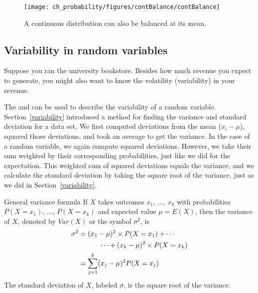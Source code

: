 \begin{figure}
\centering
\texttt{[image: ch\_probability/figures/contBalance/contBalance]}
\caption{A continuous distribution can also be balanced at its mean.}
\label{contBalance}
\end{figure}



\subsection{Variability in random variables}

Suppose you ran the university bookstore. Besides how much revenue you expect to generate, you might also want to know the volatility (variability) in your revenue. 

The  and  can be used to describe the variability of a random variable. Section~\ref{variability}
introduced a method for finding the variance and standard deviation for a data set. We first computed deviations from the mean ($x_i - \mu$), squared those deviations, and took an average to get the variance. In the case of a random variable, we again compute squared deviations. However, we take their sum weighted by their corresponding probabilities, just like we did for the expectation. This weighted sum of squared deviations equals the variance, and we calculate the standard deviation by taking the square root of the variance, just as we did in Section~\ref{variability}.

\begin{onebox}{General variance formula}
If $X$ takes outcomes $x_1$, ..., $x_k$ with probabilities $P(X=x_1)$, ..., $P(X=x_k)$ and expected value $\mu=E(X)$, then the variance of $X$, denoted by $Var(X)$ or the symbol $\sigma^2$, is
\begin{align}
\sigma^2 &= (x_1-\mu)^2\times P(X=x_1) + \cdots \notag \\
	& \qquad\quad\cdots+ (x_k-\mu)^2\times P(X=x_k) \notag \\
	&= \sum_{j=1}^{k} (x_j - \mu)^2 P(X=x_j)
\end{align}
The standard deviation of $X$, labeled $\sigma$, is the square root of the variance.
\end{onebox}

